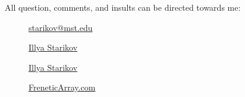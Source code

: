 \documentclass[xclolor=dvipsnames]{beamer}            %
\begin{document}
\begin{darkframes}
\begin{frame}
        All question, comments, and insults can be directed towards me:

        \begin{center}
            \begin{description}
                \item[\faComment] \href{mailto:starikov@mst.edu}{starikov@mst.edu}
                \item[\faLinkedin] \href{https://www.linkedin.com/in/illyastarikov/}{Illya Starikov}
                \item[\faGithub] \href{https://github.com/IllyaStarikov/}{Illya Starikov}
                \item[\faRss] \href{https://freneticarray.com/}{FreneticArray.com}
            \end{description}
        \end{center}
    \end{frame}
\end{darkframes}
\end{document}
